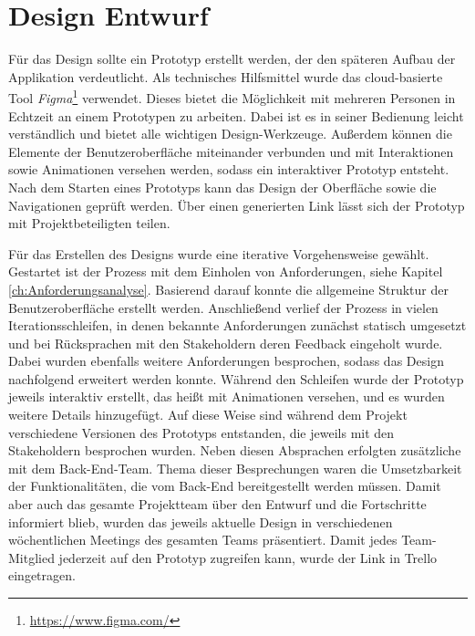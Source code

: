 
\section{Design Entwurf}\label{ch:DesignEntwurf}

Für das Design sollte ein Prototyp erstellt werden, der den späteren Aufbau der Applikation verdeutlicht.
Als technisches Hilfsmittel wurde das cloud-basierte Tool \textit{Figma}\footnote{\url{https://www.figma.com/}} verwendet.
Dieses bietet die Möglichkeit mit mehreren Personen in Echtzeit an einem Prototypen zu arbeiten.
Dabei ist es in seiner Bedienung leicht verständlich und bietet alle wichtigen Design-Werkzeuge. 
Außerdem können die Elemente der Benutzeroberfläche miteinander verbunden und mit Interaktionen sowie Animationen versehen werden, sodass ein interaktiver Prototyp entsteht.
Nach dem Starten eines Prototyps kann das Design der Oberfläche sowie die Navigationen geprüft werden.
Über einen generierten Link lässt sich der Prototyp mit Projektbeteiligten teilen. 

Für das Erstellen des Designs wurde eine iterative Vorgehensweise gewählt.  
Gestartet ist der Prozess mit dem Einholen von Anforderungen, siehe Kapitel \ref{ch:Anforderungsanalyse}.
Basierend darauf konnte die allgemeine Struktur der Benutzeroberfläche erstellt werden.
Anschließend verlief der Prozess in vielen Iterationsschleifen, in denen bekannte Anforderungen zunächst statisch umgesetzt und bei Rücksprachen mit den Stakeholdern deren Feedback eingeholt wurde.
Dabei wurden ebenfalls weitere Anforderungen besprochen, sodass das Design nachfolgend erweitert werden konnte.
Während den Schleifen wurde der Prototyp jeweils interaktiv erstellt, das heißt mit Animationen versehen, und es wurden weitere Details hinzugefügt.
Auf diese Weise sind während dem Projekt verschiedene Versionen des Prototyps entstanden, die jeweils mit den Stakeholdern besprochen wurden.
Neben diesen Absprachen erfolgten zusätzliche mit dem Back-End-Team.
Thema dieser Besprechungen waren die Umsetzbarkeit der Funktionalitäten, die vom Back-End bereitgestellt werden müssen.
Damit aber auch das gesamte Projektteam über den Entwurf und die Fortschritte informiert blieb, wurden das jeweils aktuelle Design in verschiedenen wöchentlichen Meetings des gesamten Teams präsentiert.
Damit jedes Team-Mitglied jederzeit auf den Prototyp zugreifen kann, wurde der Link in Trello eingetragen. 

